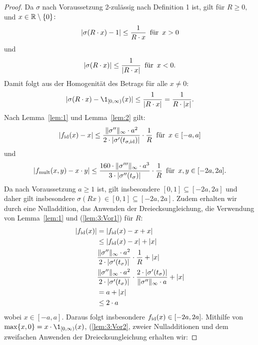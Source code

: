   \begin{proof}
  Da $\sigma$ nach Voraussetzung 2-zulässig nach Definition 1 ist, gilt für $R \geq 0,$ und $x \in \mathbb{R}\setminus\{0\}\colon$ $$|\sigma(R \cdot x) - 1| \leq \frac{1}{R\cdot x} \text{\, für \,} x > 0$$ und $$|\sigma(R \cdot x)| \leq \frac{1}{|R \cdot x|} \text{\, für \,} x < 0.$$
Damit folgt aus der Homogenität des Betrags für alle $x \neq 0$: 
\begin{equation}
\label{lem:3:Bed1} 
|\sigma(R \cdot x) - \1_{[0, \infty)}(x)| \leq \frac{1}{|R \cdot x|} = \frac{1}{R \cdot |x|}.
\end{equation} 
Nach Lemma~\ref{lem:1} und Lemma~\ref{lem:2} gilt:
\begin{equation}
\label{lem:3:Bed2} 
|f_{\mathrm{id}}(x) - x| \leq \frac{\|\sigma''\|_{\infty} \cdot a^2}{2 \cdot |\sigma'(t_{\sigma, \mathrm{id}})|} \cdot \frac{1}{R} \text{\, für \,} x \in [-a, a]
\end{equation}
 und 
\begin{equation}
\label{lem:3:Bed3}
 |f_{\mathrm{mult}}(x, y) - x \cdot y| \leq \frac{160 \cdot \|\sigma'''\|_{\infty} \cdot a ^3}{3 \cdot |\sigma''(t_{\sigma})|} \cdot \frac{1}{R} \text{\, für \,} x, y \in [-2a, 2a].
 \end{equation} 
Da nach Voraussetzung $a \geq 1$ ist, gilt insbesondere $[0, 1] \subseteq [-2a, 2a]$ und daher gilt insbesondere $\sigma(Rx) \in [0, 1]\subseteq [-2a, 2a].$ 
Zudem erhalten wir durch eine Nulladdition, das Anwenden der Dreiecksungleichung, die Verwendung von Lemma~\ref{lem:1} und (\ref{lem:3:Vor1}) für $R$:
\begin{equation*}
\begin{split}
|f_{\mathrm{id}}(x)| & = |f_{\mathrm{id}}(x) - x + x| \\
& \leq |f_{\mathrm{id}}(x) -x| + |x| \\
&  \frac{\|\sigma''\|_{\infty} \cdot a^2}{2 \cdot |\sigma'(t_{\sigma})|} \cdot \frac{1}{R} + |x| \\
& \frac{\|\sigma''\|_{\infty} \cdot a^2}{2 \cdot |\sigma'(t_{\sigma})|} \cdot \frac{2 \cdot |\sigma'(t_{\sigma})|}{\|\sigma''\|_{\infty} \cdot a} + |x| \\
& = a + |x| \\
& \leq 2 \cdot a
\end{split}
\end{equation*}
wobei $x \in [-a, a]$. Daraus folgt insbesondere $f_{\mathrm{id}}(x) \in [-2a, 2a].$
Mithilfe von $\max\{x, 0 \} = x \cdot \1_{[0, \infty)}(x)$, (\ref{lem:3:Vor2}, zweier Nulladditionen und dem zweifachen Anwenden der Dreiecksungleichung erhalten wir:

\end{proof}
